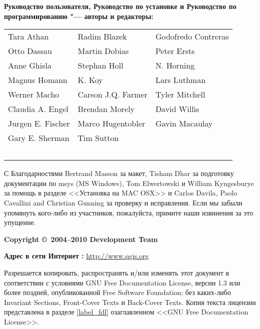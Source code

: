 \newpage

\begin{flushleft}
\textbf{Руководство пользователя, Руководство по установке и Руководство
по программированию "--- авторы и редакторы:}
  \par\bigskip\noindent
\begin{tabular}{p{4cm} p{4cm} p{4cm}}
Tara Athan & Radim Blazek & Godofredo Contreras \\
Otto Dassau & Martin Dobias & Peter Ersts \\
Anne Ghisla & Stephan Holl & N. Horning \\
Magnus Homann & K. Koy & Lars Luthman \\
Werner Macho & Carson J.Q. Farmer & Tyler Mitchell \\
Claudia A. Engel & Brendan Morely & David Willis \\
Jurgen E. Fischer & Marco Hugentobler & Gavin Macaulay \\
Gary E. Sherman & Tim Sutton \\ \
\end{tabular}
\end{flushleft}

С Благодарностями Bertrand Masson за макет, Tisham Dhar за подготовку
документации по msys (MS Windows), Tom Elwertowski и William Kyngesburye
за помощь в разделе <<Установка на MAC OSX>> и Carlos Davila, Paolo
Cavallini and Christian Gunning за проверку и исправления. Если мы
забыли упомянуть кого-либо из участников, пожалуйста, примите наши
извинения за это упущение.
\par\bigskip\noindent
\textbf{Copyright \copyright~2004--2010 \QG Development Team}
\par\bigskip\noindent
\textbf{Адрес в сети Интернет :} \url{http://www.qgis.org}

\newpage


Разрешается копировать, распространять и/или изменять этот документ в
соответствии с условиями GNU Free Documentation License, версии 1.3 или
более поздней, опубликованной Free Software Foundation; без каких-либо
Invariant Sections, Front-Cover Texts и Back-Cover Texts. Копия текста
лицензии представлена в разделе \ref{label_fdl} озаглавленном <<GNU Free
Documentation License>>.
